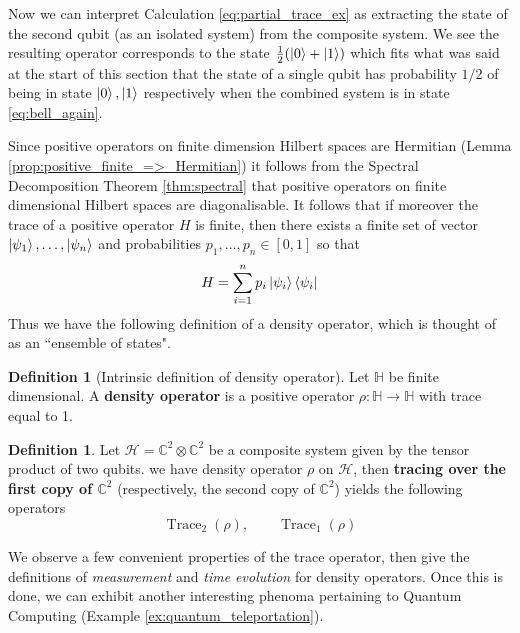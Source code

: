 \documentclass[12pt]{article}
\theoremstyle{plain}
\theoremstyle{definition}
\newtheorem{defn}[thm]{Definition} %
\newcommand{\bb}[1]{\mathbb{#1}}
\newcommand{\call}[1]{\mathcal{#1}}
\newcommand{\lto}{\longrightarrow}
\begin{document}
Now we can interpret Calculation \eqref{eq:partial_trace_ex} as extracting the state of the second qubit (as an isolated system) from the composite system. We see the resulting operator corresponds to the state $\frac{1}{2}(\ket{0} + \ket{1})$ which fits what was said at the start of this section that the state of a single qubit has probability $1/2$ of being in state $\ket{0},\ket{1}$ respectively when the combined system is in state \eqref{eq:bell_again}.

	Since positive operators on finite dimension Hilbert spaces are Hermitian (Lemma \ref{prop:positive_finite_=>_Hermitian}) it follows from the Spectral Decomposition Theorem \ref{thm:spectral} that positive operators on finite dimensional Hilbert spaces are diagonalisable. It follows that if moreover the trace of a positive operator $H$ is finite, then there exists a finite set of vector $\ket{\psi_1},\ldots, \ket{\psi_n}$ and probabilities $p_1,\ldots, p_n \in [0,1]$ so that
	\begin{equation}
	H = \sum_{i = 1}^n p_i\ket{\psi_i}\bra{\psi_i}
	\end{equation}
Thus we have the following definition of a density operator, which is thought of as an ``ensemble of states".
\begin{defn}[Intrinsic definition of density operator]\label{def:density_operator_intrinsic}
	Let $\bb{H}$ be finite dimensional. A \textbf{density operator} is a positive operator $\rho: \bb{H} \lto \bb{H}$ with trace equal to 1.
\end{defn}

\begin{defn}
	Let $\call{H} = \bb{C}^2 \otimes \bb{C}^2$ be a composite system given by the tensor product of two qubits.  we have density operator $\rho$ on $\call{H}$, then \textbf{tracing over the first copy of $\bb{C}^2$} (respectively, the second copy of $\bb{C}^2$) yields the following operators
	\begin{equation}
		\operatorname{Trace}_2(\rho),\qquad \operatorname{Trace}_1(\rho)
	\end{equation}
\end{defn}

We observe a few convenient properties of the trace operator, then give the definitions of \emph{measurement} and \emph{time evolution} for density operators. Once this is done, we can exhibit another interesting phenoma pertaining to Quantum Computing (Example \ref{ex:quantum_teleportation}).
	
\end{document}
